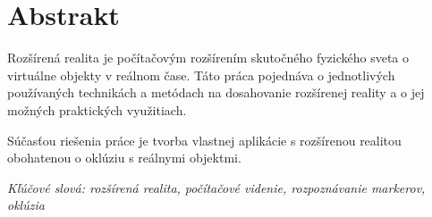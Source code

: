 \thispagestyle{empty}
\chapter*{Abstrakt}
Rozšírená realita je počítačovým rozšírením skutočného fyzického sveta o virtuálne objekty v reálnom čase. Táto práca pojednáva o jednotlivých používaných technikách a metódach na dosahovanie rozšírenej reality a o jej možných praktických využitiach. \par

Súčasťou riešenia práce je tvorba vlastnej aplikácie s rozšírenou realitou obohatenou o oklúziu s reálnymi objektmi. \par

\emph{Kľúčové slová: rozšírená realita, počítačové videnie, rozpoznávanie markerov, oklúzia}
\pagebreak